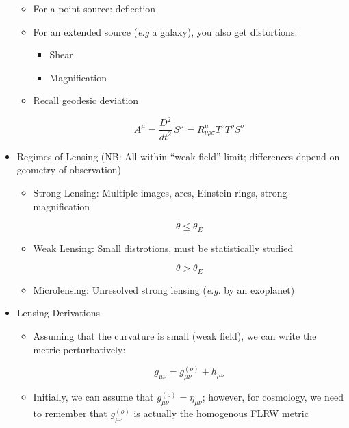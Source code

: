 \begin{itemize}
\begin{itemize}
      \item For a point source: deflection

      \item For an extended source (\textit{e}.\textit{g} a galaxy), you also get distortions:

        \begin{itemize}

          \item Shear

          \item Magnification

        \end{itemize}

      \item Recall geodesic deviation

        $$A^{\mu}=\frac{D^2}{dt^2}\,S^{\mu}=R^{\mu}_{\nu\rho\sigma}T^{\nu}T^{\rho}S^{\sigma}$$

    \end{itemize}

  \item Regimes of Lensing (NB: All within ``weak field'' limit; differences depend on geometry of observation)

    \begin{itemize}

      \item Strong Lensing: Multiple images, arcs, Einstein rings, strong magnification

        $$\theta\leq \theta_E$$

      \item Weak Lensing: Small distrotions, must be statistically studied

        $$\theta > \theta_E$$

      \item Microlensing: Unresolved strong lensing (\textit{e}.\textit{g}. by an exoplanet)

    \end{itemize}

  \item Lensing Derivations

    \begin{itemize}

      \item Assuming that the curvature is small (weak field), we can write the metric perturbatively:

        $$g_{\mu\nu}=g^{(o)}_{\mu\nu}+h_{\mu\nu}$$

      \item Initially, we can assume that $g_{\mu\nu}^{(o)}=\eta_{\mu\nu}$; however, for cosmology, we need to remember that $g^{(o)}_{\mu\nu}$ is actually the homogenous FLRW metric


\end{itemize}
\end{itemize}
